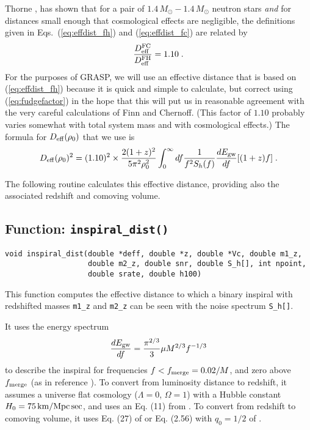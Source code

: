 Thorne {\cite{thornetofinnhughes},\cite{thornefinnerror}} has shown
that for a pair of $1.4\,M_\odot-1.4\,M_\odot$ neutron stars {\it and}
for distances small enough that cosmological effects are negligible,
the definitions given in Eqs.\ (\ref{eq:effdist_fh}) and
(\ref{eq:effdist_fc}) are related by
\begin{equation}
{D^{\rm FC}_{\rm eff}\over D^{\rm FH}_{\rm eff}} = 1.10\;.
\label{eq:fudgefactor}
\end{equation}
For the purposes of GRASP, we will use an effective distance that is
based on (\ref{eq:effdist_fh}) because it is quick and simple to
calculate, but correct using (\ref{eq:fudgefactor}) in the hope that
this will put us in reasonable agreement with the very careful
calculations of Finn and Chernoff.  (This factor of $1.10$ probably
varies somewhat with total system mass and with cosmological effects.)
The formula for $D_{\rm eff}(\rho_0)$ that we use is
\begin{equation}
D_{\rm eff}(\rho_0)^2 = (1.10)^2 \times{2(1+z)^2\over5\pi^2
\rho_0^2}\int_0^\infty df {1\over f^2 S_h(f)}{dE_{\rm gw}
\over df}[(1+z)f]\;.
\label{eq:effdist}
\end{equation}

The following routine calculates this effective distance, providing
also the associated redshift and comoving volume.

\clearpage
\subsection{Function: {\tt inspiral\_dist()}}
\label{ss:inspiral_dist}
\begin{verbatim}
void inspiral_dist(double *deff, double *z, double *Vc, double m1_z,
                   double m2_z, double snr, double S_h[], int npoint,
                   double srate, double h100)
\end{verbatim}
\noindent
This function computes the effective distance to which a binary
inspiral with redshifted masses {\tt m1\_z} and {\tt m2\_z} can be
seen with the noise spectrum {\tt S\_h[]}.

It uses the energy spectrum
\begin{equation}
{dE_{\rm gw}\over df} = {\pi^{2/3} \over 3}\mu M^{2/3} f^{-1/3}
\label{eq:inspspec}
\end{equation}
to describe the inspiral for frequencies $f < f_{\rm merge} = 0.02/M$,
and zero above $f_{\rm merge}$ (as in reference {\cite{flanhughes1}}).
To convert from luminosity distance to redshift, it assumes a universe
flat cosmology ($\Lambda=0$, $\Omega=1$) with a Hubble constant $H_0 =
75\,{\rm km}/{{\rm Mpc}\,{\rm sec}}$, and uses an Eq. (11) from
{\cite{markovic}}.  To convert from redshift to comoving volume, it
uses Eq. (27) of {\cite{dwhogg}} or Eq. (2.56) with $q_0=1/2$ of
\cite{kolbturner}.

